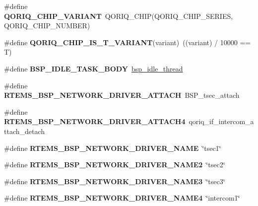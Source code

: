 \begin{DoxyCompactItemize}
\#define {\bfseries Q\+O\+R\+I\+Q\+\_\+\+C\+H\+I\+P\+\_\+\+V\+A\+R\+I\+A\+NT}~Q\+O\+R\+I\+Q\+\_\+\+C\+H\+IP(Q\+O\+R\+I\+Q\+\_\+\+C\+H\+I\+P\+\_\+\+S\+E\+R\+I\+ES, Q\+O\+R\+I\+Q\+\_\+\+C\+H\+I\+P\+\_\+\+N\+U\+M\+B\+ER)
\item 
\mbox{\label{group__RTEMSBSPsPowerPCQorIQ_gade226f23e1c6769c734b9025938ee888}} 
\#define {\bfseries Q\+O\+R\+I\+Q\+\_\+\+C\+H\+I\+P\+\_\+\+I\+S\+\_\+\+T\+\_\+\+V\+A\+R\+I\+A\+NT}(variant)~((variant) / 10000 == \textquotesingle{}T\textquotesingle{})
\item 
\mbox{\label{group__RTEMSBSPsPowerPCQorIQ_ga4aa606d0badadcc28e8054cb60f13b56}} 
\#define {\bfseries B\+S\+P\+\_\+\+I\+D\+L\+E\+\_\+\+T\+A\+S\+K\+\_\+\+B\+O\+DY}~\mbox{\hyperlink{group__RTEMSBSPsSPARCLEON3_ga301be7085b80c41a9c5887247003c662}{bsp\+\_\+idle\+\_\+thread}}
\item 
\mbox{\label{group__RTEMSBSPsPowerPCQorIQ_gadde0d66aef9442971dde465292ac14e6}} 
\#define {\bfseries R\+T\+E\+M\+S\+\_\+\+B\+S\+P\+\_\+\+N\+E\+T\+W\+O\+R\+K\+\_\+\+D\+R\+I\+V\+E\+R\+\_\+\+A\+T\+T\+A\+CH}~B\+S\+P\+\_\+tsec\+\_\+attach
\item 
\mbox{\label{group__RTEMSBSPsPowerPCQorIQ_gad973dd6c2146284a02f4062b8dea89c6}} 
\#define {\bfseries R\+T\+E\+M\+S\+\_\+\+B\+S\+P\+\_\+\+N\+E\+T\+W\+O\+R\+K\+\_\+\+D\+R\+I\+V\+E\+R\+\_\+\+A\+T\+T\+A\+C\+H4}~qoriq\+\_\+if\+\_\+intercom\+\_\+attach\+\_\+detach
\item 
\mbox{\label{group__RTEMSBSPsPowerPCQorIQ_ga86d4f9aa98431100692e31068070a8df}} 
\#define {\bfseries R\+T\+E\+M\+S\+\_\+\+B\+S\+P\+\_\+\+N\+E\+T\+W\+O\+R\+K\+\_\+\+D\+R\+I\+V\+E\+R\+\_\+\+N\+A\+ME}~\char`\"{}tsec1\char`\"{}
\item 
\mbox{\label{group__RTEMSBSPsPowerPCQorIQ_ga9c7a480d4bd0eabe6766c4c6e24a340b}} 
\#define {\bfseries R\+T\+E\+M\+S\+\_\+\+B\+S\+P\+\_\+\+N\+E\+T\+W\+O\+R\+K\+\_\+\+D\+R\+I\+V\+E\+R\+\_\+\+N\+A\+M\+E2}~\char`\"{}tsec2\char`\"{}
\item 
\mbox{\label{group__RTEMSBSPsPowerPCQorIQ_gaefc5005ef7d470fee5123087709f486b}} 
\#define {\bfseries R\+T\+E\+M\+S\+\_\+\+B\+S\+P\+\_\+\+N\+E\+T\+W\+O\+R\+K\+\_\+\+D\+R\+I\+V\+E\+R\+\_\+\+N\+A\+M\+E3}~\char`\"{}tsec3\char`\"{}
\item 
\mbox{\label{group__RTEMSBSPsPowerPCQorIQ_gac8ba5fb611ecf605e6222a30769119b6}} 
\#define {\bfseries R\+T\+E\+M\+S\+\_\+\+B\+S\+P\+\_\+\+N\+E\+T\+W\+O\+R\+K\+\_\+\+D\+R\+I\+V\+E\+R\+\_\+\+N\+A\+M\+E4}~\char`\"{}intercom1\char`\"{}
\end{DoxyCompactItemize}
